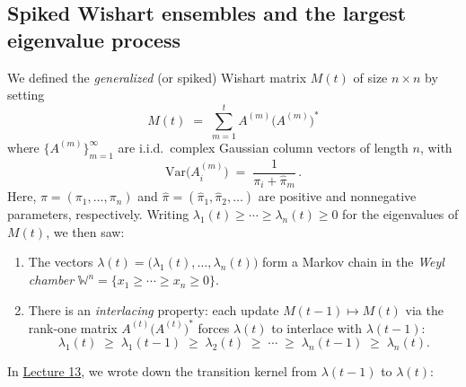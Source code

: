 \documentclass[letterpaper,11pt,oneside,reqno]{article}
\numberwithin{equation}{section}
\theoremstyle{definition}
\begin{document}
\subsection{Spiked Wishart ensembles and the largest eigenvalue process}

We defined the \emph{generalized} (or spiked) Wishart matrix $M(t)$ of size $n\times n$ by setting
\[
M(t)\;=\;\sum_{m=1}^t A^{(m)}\bigl(A^{(m)}\bigr)^*
\]
where $\{A^{(m)}\}_{m=1}^\infty$ are i.i.d.\ complex Gaussian column vectors of length $n$, with
\[
\mathrm{Var}\bigl(A^{(m)}_i\bigr)
\;=\;
\frac{1}{\pi_i + \hat\pi_m}\,.
\]
Here, $\pi=(\pi_1,\dots,\pi_n)$ and $\hat\pi=(\hat\pi_1,\hat\pi_2,\dots)$ are positive and nonnegative parameters, respectively.  Writing $\lambda_1(t)\ge\cdots\ge\lambda_n(t)\ge0$ for the eigenvalues of $M(t)$, we then saw:

\begin{enumerate}
\item The vectors $\lambda(t)=\bigl(\lambda_1(t),\dots,\lambda_n(t)\bigr)$ form a Markov chain in the \emph{Weyl chamber} $\mathbb{W}^n = \{x_1\ge\cdots\ge x_n\ge0\}$.
\item There is an \emph{interlacing} property: each update $M(t-1)\mapsto M(t)$ via the rank-one matrix $A^{(t)}\bigl(A^{(t)}\bigr)^*$ forces $\lambda(t)$ to interlace with $\lambda(t-1)$:
\[
\lambda_1(t)\;\ge\;\lambda_1(t-1)\;\ge\;\lambda_2(t)\;\ge\;\cdots\;\ge\;\lambda_n(t-1)\;\ge\;\lambda_n(t).
\]
\end{enumerate}

In \href{https://lpetrov.cc/rmt25/rmt25-notes/rmt2025-l13.pdf}{Lecture 13},
we wrote down the
transition kernel
from $\lambda(t-1)$ to $\lambda(t)$:
\end{document}
